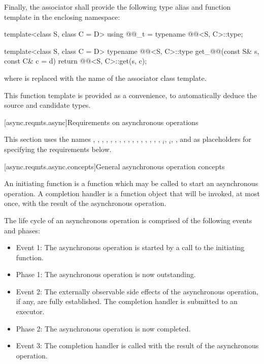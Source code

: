 \pnum
 Finally, the associator shall provide the following type alias and function template in the enclosing namespace:

\begin{codeblock}
template<class S, class C = D> using @@_t = typename @@<S, C>::type;

template<class S, class C = D>
typename @@<S, C>::type get_@@(const S& s, const C& c = d)
{
  return @@<S, C>::get(s, c);
}
\end{codeblock}

where  is replaced with the name of the associator class template.
\begin{note} This function template is provided as a convenience, to automatically deduce the source and candidate types. \end{note}



[async.reqmts.async]{Requirements on asynchronous operations}

\pnum
This section uses the names , , , , , , , , , , , , , , , , $_i$, $_i$, , and  as placeholders for specifying the requirements below.


[async.reqmts.async.concepts]{General asynchronous operation concepts}

\pnum
An initiating function is a function which may be called to start an asynchronous operation. A completion handler is a function object that will be invoked, at most once, with the result of the asynchronous operation.

\pnum
 The life cycle of an asynchronous operation is comprised of the following events and phases:

\begin{itemize}
\item
Event 1: The asynchronous operation is started by a call to the initiating function.

\item
Phase 1: The asynchronous operation is now outstanding.

\item
Event 2: The externally observable side effects of the asynchronous operation, if any, are fully established. The completion handler is submitted to an executor.

\item
Phase 2: The asynchronous operation is now completed.

\item
Event 3: The completion handler is called with the result of the asynchronous operation.
\end{itemize}

